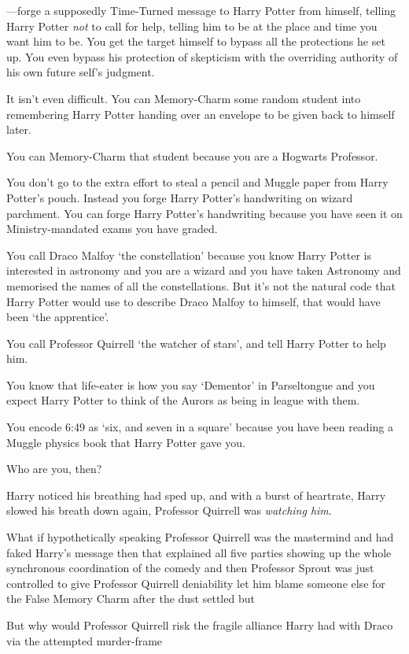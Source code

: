 —forge a supposedly Time-Turned message to Harry Potter from himself, telling
Harry Potter \emph{not} to call for help, telling him to be at the place and
time you want him to be. You get the target himself to bypass all the
protections he set up. You even bypass his protection of skepticism with the
overriding authority of his own future self's judgment.

It isn't even difficult. You can Memory-Charm some random student into
remembering Harry Potter handing over an envelope to be given back to himself
later.

You can Memory-Charm that student because you are a Hogwarts Professor.

You don't go to the extra effort to steal a pencil and Muggle paper from Harry
Potter's pouch. Instead you forge Harry Potter's handwriting on wizard
parchment. You can forge Harry Potter's handwriting because you have seen it on
Ministry-mandated exams you have graded.

You call Draco Malfoy `the constellation' because you know Harry Potter is
interested in astronomy and you are a wizard and you have taken Astronomy and
memorised the names of all the constellations. But it's not the natural code
that Harry Potter would use to describe Draco Malfoy to himself, that would
have been `the apprentice'.

You call Professor Quirrell `the watcher of stars', and tell Harry Potter to
help him.

You know that life-eater is how you say `Dementor' in Parseltongue and you
expect Harry Potter to think of the Aurors as being in league with them.

You encode 6:49 as `six, and seven in a square' because you have been reading a
Muggle physics book that Harry Potter gave you.

Who are you, then?

Harry noticed his breathing had sped up, and with a burst of heartrate, Harry
slowed his breath down again, Professor Quirrell was \emph{watching him}.

What if hypothetically speaking Professor Quirrell was the mastermind and had
faked Harry's message then that explained all five parties showing up the whole
synchronous coordination of the comedy and then Professor Sprout was just
controlled to give Professor Quirrell deniability let him blame someone else
for the False Memory Charm after the dust settled but

But why would Professor Quirrell risk the fragile alliance Harry had with Draco
via the attempted murder-frame

